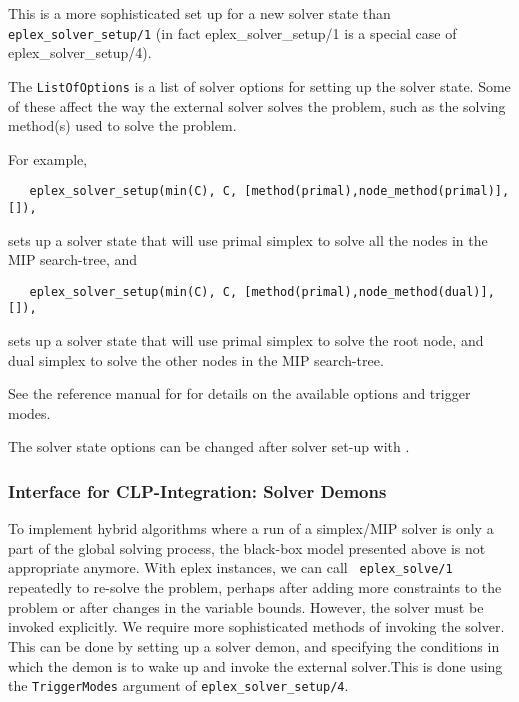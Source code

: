 
This is a more sophisticated set up for a new solver state than
{\tt eplex_solver_setup/1} (in fact eplex_solver_setup/1 is a special case
of eplex_solver_setup/4). 

The {\tt ListOfOptions} is a list of solver options for setting up the
solver state. Some of these affect the way the external solver solves the
problem, such as the solving method(s) used to solve the problem.

For example,

\begin{verbatim}
   eplex_solver_setup(min(C), C, [method(primal),node_method(primal)], []),
\end{verbatim}
sets up a solver state that will use primal simplex to solve all the nodes in
the MIP search-tree, and
\begin{verbatim}
   eplex_solver_setup(min(C), C, [method(primal),node_method(dual)], []),
\end{verbatim}
sets up a solver state that will use primal simplex to solve the root node, and
dual simplex to solve the other nodes in the MIP search-tree.

See the reference manual for  for
details on the available options and trigger modes.

The solver state options can be changed after solver set-up with
.

\subsubsection{Interface for CLP-Integration: Solver Demons}

To implement hybrid algorithms where a run of a simplex/MIP solver is only
a part of the global solving process, the black-box model presented above
is not appropriate anymore. With eplex instances, we can call {\tt
eplex_solve/1} repeatedly to re-solve the problem, perhaps after adding
more constraints to the problem or after changes in the variable
bounds. However, the solver must be invoked explicitly. We require more
sophisticated methods of invoking the solver. This can be done by setting
up a solver demon, and specifying the conditions in which the demon is to
wake up and invoke the external solver.This is done using the {\tt TriggerModes}
argument of  {\tt eplex_solver_setup/4}.

